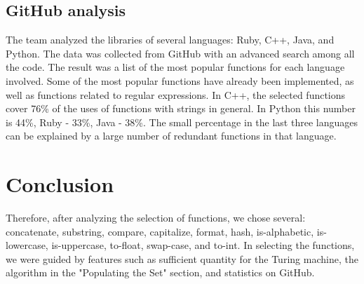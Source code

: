 \documentclass[11pt,nonacm,natbib=false]{acmart}
\begin{document}
\subsection{GitHub analysis}
\begin{inparaenum}
The team analyzed the libraries of several languages: Ruby, C++, Java, and Python. The data was collected from GitHub with an advanced search among all the code. The result was a list of the most popular functions for each language involved. Some of the most popular functions have already been implemented, as well as functions related to regular expressions. In C++, the selected functions cover 76\% of the uses of functions with strings in general. In Python this number is 44\%, Ruby - 33\%, Java - 38\%. The small percentage in the last three languages can be explained by a large number of redundant functions in that language.
\end{inparaenum}


\section{Conclusion}
Therefore, after analyzing the selection of functions, we chose several: concatenate, substring, compare, capitalize, format, hash, is-alphabetic, is-lowercase, is-uppercase, to-float, swap-case, and to-int. In selecting the functions, we were guided by features such as sufficient quantity for the Turing machine, the algorithm in the "Populating the Set" section, and statistics on GitHub. 
\end{document}
